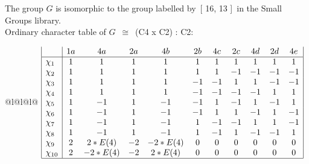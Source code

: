 \documentclass[varwidth=\maxdimen,border=10]{standalone}
\begin{document}
The group $G$ is isomorphic to the group labelled by\ [ 16, 13 ]\ in the Small Groups library.\\
Ordinary character table of $G$\ $\cong$\ (C4 x C2) : C2:\\
\begin{center}
\begin{tabular}{@{}l@{}l@{}l@{}}
\hline
\(\begin{array}{|l|cccccccccc|}
  & 1a & 4a & 2a & 4b & 2b & 4c & 2c & 4d & 2d & 4e\\ \hline
\chi_{1} & 1 & 1 & 1 & 1 & 1 & 1 & 1 & 1 & 1 & 1\\
\chi_{2} & 1 & 1 & 1 & 1 & 1 & 1 & -1 & -1 & -1 & -1\\
\chi_{3} & 1 & 1 & 1 & 1 & -1 & -1 & 1 & 1 & -1 & -1\\
\chi_{4} & 1 & 1 & 1 & 1 & -1 & -1 & -1 & -1 & 1 & 1\\
\chi_{5} & 1 & -1 & 1 & -1 & -1 & 1 & -1 & 1 & -1 & 1\\
\chi_{6} & 1 & -1 & 1 & -1 & -1 & 1 & 1 & -1 & 1 & -1\\
\chi_{7} & 1 & -1 & 1 & -1 & 1 & -1 & -1 & 1 & 1 & -1\\
\chi_{8} & 1 & -1 & 1 & -1 & 1 & -1 & 1 & -1 & -1 & 1\\
\chi_{9} & 2 & 2*E(4) & -2 & -2*E(4) & 0 & 0 & 0 & 0 & 0 & 0\\
\chi_{10} & 2 & -2*E(4) & -2 & 2*E(4) & 0 & 0 & 0 & 0 & 0 & 0\\
\hline
\end{array}\)\\
\end{tabular}
\end{center}
\end{document}
